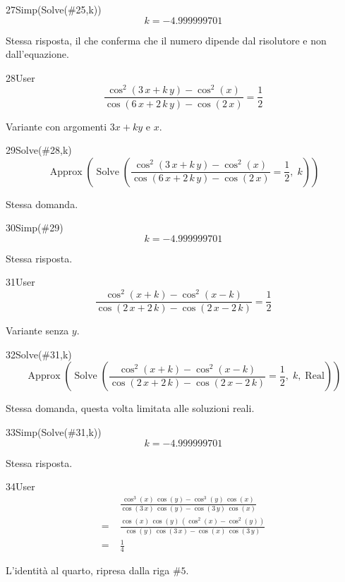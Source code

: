 \begin{espr}{27}{Simp(Solve(\#25,k))}{}
\[
k = -4.999999701
\]
\end{espr}
Stessa risposta, il che conferma che il numero dipende dal risolutore e non dall'equazione.

\begin{espr}{28}{User}{\verificata}
\[
\frac{\cos^{2}\!\left(3\, x + k\, y\right) - \cos^{2}\!\left(x\right)}{\cos\!\left(6\, x + 2\, k\, y\right) - \cos\!\left(2\, x\right)} = \frac{1}{2}
\]
\end{espr}
Variante con argomenti $3x+ky$ e $x$.

\begin{espr}{29}{Solve(\#28,k)}{}
\[
\operatorname{Approx}\!\left(\operatorname{Solve}\!\left(\frac{\cos^{2}\!\left(3\, x + k\, y\right) - \cos^{2}\!\left(x\right)}{\cos\!\left(6\, x + 2\, k\, y\right) - \cos\!\left(2\, x\right)} = \frac{1}{2},\; k\right)\right)
\]
\end{espr}
Stessa domanda.

\begin{espr}{30}{Simp(\#29)}{}
\[
k = -4.999999701
\]
\end{espr}
Stessa risposta.

\begin{espr}{31}{User}{\verificata}
\[
\frac{\cos^{2}\!\left(x + k\right) - \cos^{2}\!\left(x - k\right)}{\cos\!\left(2\, x + 2\, k\right) - \cos\!\left(2\, x - 2\, k\right)} = \frac{1}{2}
\]
\end{espr}
Variante senza $y$.

\begin{espr}{32}{Solve(\#31,k)}{}
\[
\operatorname{Approx}\!\left(\operatorname{Solve}\!\left(\frac{\cos^{2}\!\left(x + k\right) - \cos^{2}\!\left(x - k\right)}{\cos\!\left(2\, x + 2\, k\right) - \cos\!\left(2\, x - 2\, k\right)} = \frac{1}{2},\; k,\; \mathrm{Real}\right)\right)
\]
\end{espr}
Stessa domanda, questa volta limitata alle soluzioni reali.

\begin{espr}{33}{Simp(Solve(\#31,k))}{}
\[
k = -4.999999701
\]
\end{espr}
Stessa risposta.

\begin{espr}{34}{User}{\verificata}
\begin{align*}
& \frac{\cos^{3}\!\left(x\right)\, \cos\!\left(y\right) - \cos^{3}\!\left(y\right)\, \cos\!\left(x\right)}{\cos\!\left(3\, x\right)\, \cos\!\left(y\right) - \cos\!\left(3\, y\right)\, \cos\!\left(x\right)} \\
=\;& \frac{\cos\!\left(x\right)\, \cos\!\left(y\right)\, \left(\cos^{2}\!\left(x\right) - \cos^{2}\!\left(y\right)\right)}{\cos\!\left(y\right)\, \cos\!\left(3\, x\right) - \cos\!\left(x\right)\, \cos\!\left(3\, y\right)} \\
=\;& \frac{1}{4}
\end{align*}
\end{espr}
L'identità al quarto, ripresa dalla riga $\#5$.

